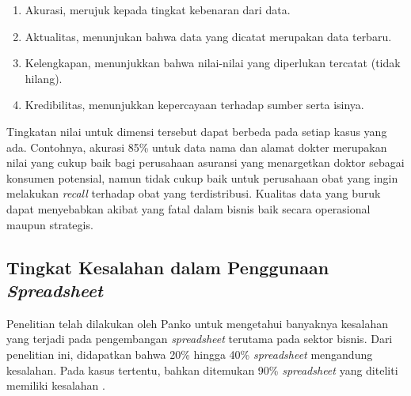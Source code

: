     \begin{enumerate}
        \item Akurasi, merujuk kepada tingkat kebenaran dari data.
        \item Aktualitas, menunjukan bahwa data yang dicatat merupakan data terbaru.
        \item Kelengkapan, menunjukkan bahwa nilai-nilai yang diperlukan tercatat (tidak hilang).
        \item Kredibilitas, menunjukkan kepercayaan terhadap sumber serta isinya.
    \end{enumerate}

Tingkatan nilai untuk dimensi tersebut dapat berbeda pada setiap kasus yang ada. Contohnya, akurasi 85\% untuk data nama dan alamat dokter merupakan nilai yang cukup baik bagi perusahaan asuransi yang menargetkan doktor sebagai konsumen potensial, namun tidak cukup baik untuk perusahaan obat yang ingin melakukan \textit{recall} terhadap obat yang terdistribusi. Kualitas data yang buruk dapat menyebabkan akibat yang fatal dalam bisnis baik secara operasional maupun strategis. 

\subsection{Tingkat Kesalahan dalam Penggunaan \textit{Spreadsheet}}
Penelitian telah dilakukan oleh Panko \citep{Panko1998} untuk mengetahui banyaknya kesalahan yang terjadi pada pengembangan \textit{spreadsheet} terutama pada sektor bisnis. Dari penelitian ini, didapatkan bahwa 20\% hingga 40\% \textit{spreadsheet} mengandung kesalahan. Pada kasus tertentu, bahkan ditemukan 90\% \textit{spreadsheet} yang diteliti memiliki kesalahan \citep{Journal1996}. 


